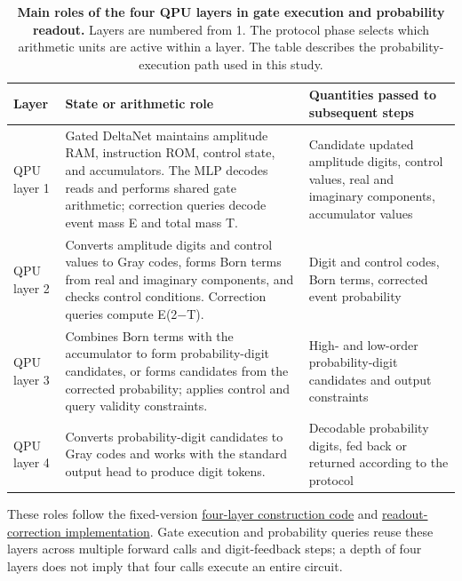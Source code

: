 \documentclass[11pt,a4paper]{article}
\begin{document}
\begin{table}[!htbp]
\centering
\small
\renewcommand{\arraystretch}{1.16}
\caption{\textbf{Main roles of the four QPU layers in gate execution and probability readout.} Layers are numbered from 1. The protocol phase selects which arithmetic units are active within a layer. The table describes the probability-execution path used in this study.}
\label{tab:2}
\begin{tabular}{@{}>{\raggedright\arraybackslash}p{}>{\raggedright\arraybackslash}p{}>{\raggedright\arraybackslash}p{}@{}}
\toprule
\textbf{Layer} & \textbf{State or arithmetic role} & \textbf{Quantities passed to subsequent steps} \\
\midrule
QPU layer 1 & Gated DeltaNet maintains amplitude RAM, instruction ROM, control state, and accumulators. The MLP decodes reads and performs shared gate arithmetic; correction queries decode event mass E and total mass T. & Candidate updated amplitude digits, control values, real and imaginary components, accumulator values \\[2pt]
QPU layer 2 & Converts amplitude digits and control values to Gray codes, forms Born terms from real and imaginary components, and checks control conditions. Correction queries compute E(2\ensuremath{-}T). & Digit and control codes, Born terms, corrected event probability \\[2pt]
QPU layer 3 & Combines Born terms with the accumulator to form probability-digit candidates, or forms candidates from the corrected probability; applies control and query validity constraints. & High- and low-order probability-digit candidates and output constraints \\[2pt]
QPU layer 4 & Converts probability-digit candidates to Gray codes and works with the standard output head to produce digit tokens. & Decodable probability digits, fed back or returned according to the protocol \\[2pt]
\bottomrule
\end{tabular}
\end{table}

These roles follow the fixed-version \href{https://github.com/xi-zhao/QwenQPU/blob/caae45327b46458163d0840a4c1466e5575a7b4f/research/standard_layers/compact_checkpoint.py}{four-layer construction code} and \href{https://github.com/xi-zhao/QwenQPU/blob/caae45327b46458163d0840a4c1466e5575a7b4f/research/standard_layers/experiments/compact_normalized_readout.py}{readout-correction implementation}. Gate execution and probability queries reuse these layers across multiple forward calls and digit-feedback steps; a depth of four layers does not imply that four calls execute an entire circuit.
\end{document}
